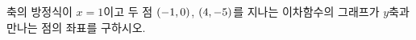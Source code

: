 축의 방정식이 $x=1$이고 두 점 $(-1{,}\mkern3mu\mathopen{}0)$, $(4{,}\mkern3mu\mathopen{}-5)$를 지나는 이차함수의 그래프가 $y$축과 만나는 점의 좌표를 구하시오.
